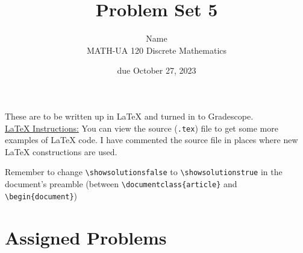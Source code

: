 \documentclass{article}
\title{Problem Set 5}
\author{%
    Name
\\  MATH-UA 120 Discrete Mathematics
}
\date{due October 27, 2023}
\newif\ifshowsolutions
\newcommand{\danger}{\marginpar[\hfill\dbend]{\dbend\hfill}}
\theoremstyle{definition}
\begin{document}
\maketitle



These are to be written up in \LaTeX{} and turned in to Gradescope.\\



\ifshowsolutions
    \SetupExSheets{solution/print=true}
\else
    \danger
 \underline{ \LaTeX{}  Instructions:}  You can view the source (\texttt{.tex}) file to get some more examples of \LaTeX{} code.  I have commented the source file in places where new \LaTeX{} constructions are used.
  
  Remember to change \verb|\showsolutionsfalse| to \verb|\showsolutionstrue|
    in the document's preamble 
    (between \verb|\documentclass{article}| and \verb|\begin{document}|)
\fi

\section*{Assigned Problems}
\end{document}
